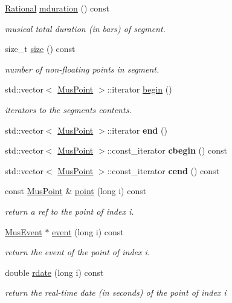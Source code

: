 \begin{DoxyCompactItemize}
\mbox{\hyperlink{classRational}{Rational}} \mbox{\hyperlink{classInputSegment_aa5410aeef3d5c6a263424b252eb78511}{mduration}} () const
\begin{DoxyCompactList}\small\item\em musical total duration (in bars) of segment. \end{DoxyCompactList}\item 
size\+\_\+t \mbox{\hyperlink{group__segment_ga05fee2bd8565c3076a6d800e37d7ab63}{size}} () const
\begin{DoxyCompactList}\small\item\em number of non-\/floating points in segment. \end{DoxyCompactList}\item 
std\+::vector$<$ \mbox{\hyperlink{classMusPoint}{Mus\+Point}} $>$\+::iterator \mbox{\hyperlink{group__segment_gaccf3b9127fc3d068a95af19f46d9052d}{begin}} ()
\begin{DoxyCompactList}\small\item\em iterators to the segment\textquotesingle{}s contents. \end{DoxyCompactList}\item 
std\+::vector$<$ \mbox{\hyperlink{classMusPoint}{Mus\+Point}} $>$\+::iterator {\bfseries end} ()
\item 
std\+::vector$<$ \mbox{\hyperlink{classMusPoint}{Mus\+Point}} $>$\+::const\+\_\+iterator {\bfseries cbegin} () const
\item 
std\+::vector$<$ \mbox{\hyperlink{classMusPoint}{Mus\+Point}} $>$\+::const\+\_\+iterator {\bfseries cend} () const
\item 
const \mbox{\hyperlink{classMusPoint}{Mus\+Point}} \& \mbox{\hyperlink{group__segment_ga5463f900db31be4b7d109e88a710971f}{point}} (long i) const
\begin{DoxyCompactList}\small\item\em return a ref to the point of index i. \end{DoxyCompactList}\item 
\mbox{\hyperlink{classMusEvent}{Mus\+Event}} $\ast$ \mbox{\hyperlink{group__segment_gafaa215f8df4e03b3e22c4c5eb3e494ca}{event}} (long i) const
\begin{DoxyCompactList}\small\item\em return the event of the point of index i. \end{DoxyCompactList}\item 
double \mbox{\hyperlink{group__segment_ga7c26187b3e70ea62bd10b9b15284a99a}{rdate}} (long i) const
\begin{DoxyCompactList}\small\item\em return the real-\/time date (in seconds) of the point of index i \end{DoxyCompactList}\item 

\end{DoxyCompactItemize}
